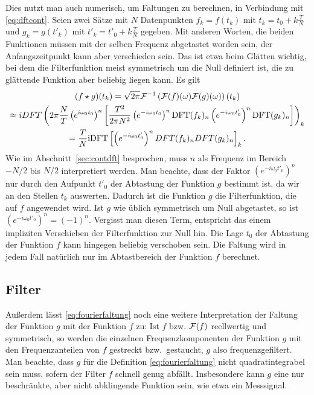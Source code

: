 Dies nutzt man auch numerisch, um Faltungen zu berechnen, in
Verbindung mit \eqref{eq:dftcont}. Seien zwei Sätze mit $N$ Datenpunkten $f_k =
f(t_k)$  mit $t_k = t_0 + k\frac{T}{N}$  und $g_k = g(t'_k) $ mit
$t'_k = t'_0 + k\frac{T}{N}$ gegeben. Mit anderen Worten, die beiden
Funktionen müssen mit der selben Frequenz abgetastet worden sein, der
Anfangszeitpunkt kann aber verschieden sein. Das ist etwa beim
Glätten wichtig, bei dem die Filterfunktion meist symmetrisch um die
Null definiert ist, die zu glättende Funktion aber beliebig liegen
kann. Es gilt
\begin{multline}
  \label{eq:discretefold}
  (f\star g)(t_k) =
  \sqrt{2\pi}\mathcal F^{-1}\left(\mathcal F(f)(\omega)\mathcal F(g)(\omega)\right)(t_k)\\
  \approx
  iDFT\left(2\pi \frac{N}{T} \left(e^{i\omega_0 t_0}\right)^n
  \left[\frac{T^2}{2\pi N^2}\left(e^{-i\omega_0 t_0}\right)^n\text{DFT}(f_k)_n\left(e^{-i\omega_0 t'_0}\right)^n\text{DFT}(g_k)_n\right]\right)_k\\
  =
  \frac{T}{N} \text{iDFT}\left[\left(e^{-i\omega_0 t'_0}\right)^n DFT(f_k)_n DFT(g_k)_n\right]_k.
\end{multline}
Wie im Abschnitt~\ref{sec:contdft} besprochen, muss $n$ als Frequenz
im Bereich $-N/2$ bis $N/2$ interpretiert werden. Man beachte, dass
der Faktor $\left(e^{-i\omega_0 t'_0}\right)^n$ nur durch den Aufpunkt
$t'_0$ der Abtastung der Funktion $g$ bestimmt ist, da wir an den
Stellen $t_k$ auswerten. Dadurch ist die Funktion $g$ die
Filterfunktion, die auf $f$ angewendet wird. Ist $g$ wie üblich
symmetrisch um Null abgetastet, so ist $\left(e^{-i\omega_0
    t'_0}\right)^n=(-1)^n$. Vergisst man diesen Term, entspricht das
einem impliziten Verschieben der Filterfunktion zur Null hin.
Die Lage $t_0$ der Abtastung der Funktion $f$ kann hingegen beliebig
verschoben sein. Die Faltung wird in jedem Fall natürlich nur im
Abtastbereich der Funktion $f$ berechnet.

\subsection{Filter}

Außerdem lässt \eqref{eq:fourierfaltung} noch eine weitere
Interpretation der Faltung der Funktion $g$ mit der Funktion $f$ zu:
Ist $f$ bzw. $\mathcal F(f)$ reellwertig und symmetrisch, so werden die
einzelnen Frequenzkomponenten der Funktion $g$ mit den
Frequenzanteilen von $f$ gestreckt bzw.\ gestaucht, $g$ also
frequenzgefiltert. Man beachte, dass $g$ für die Definition
\eqref{eq:fourierfaltung} nicht quadratintegrabel sein muss, sofern
der Filter $f$ schnell genug abfällt. Insbesondere kann $g$ eine nur
beschränkte, aber nicht abklingende Funktion sein, wie etwa ein
Messsignal.

